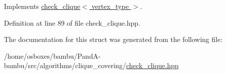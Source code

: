 Implements \hyperlink{structcheck__clique_a9b4bfcf91eab9a68e1b75371ce372515}{check\+\_\+clique$<$ vertex\+\_\+type $>$}.



Definition at line 89 of file check\+\_\+clique.\+hpp.



The documentation for this struct was generated from the following file\+:\begin{DoxyCompactItemize}
\item 
/home/osboxes/bambu/\+Pand\+A-\/bambu/src/algorithms/clique\+\_\+covering/\hyperlink{check__clique_8hpp}{check\+\_\+clique.\+hpp}\end{DoxyCompactItemize}
